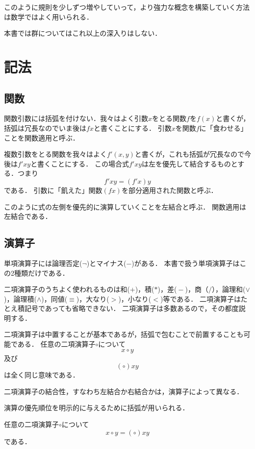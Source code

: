 \documentclass[twocolumn]{jsbook}
\newenvironment{point}{\begin{screen}}{\end{screen}}
\newcommand{\binaryeq}{\equiv}
\newcommand{\binaryl}{<}
\newcommand{\binaryg}{>}
\newcommand{\binaryadd}{+}
\newcommand{\binarysub}{-}
\newcommand{\binarymultiply}{*}
\newcommand{\binarydivide}{/}
\newcommand{\binaryor}{\vee}
\newcommand{\binaryand}{\wedge}
\newcommand{\mathbinaryop}{\circ}
\begin{document}
このように規則を少しずつ増やしていって，より強力な概念を構築していく方法は数学ではよく用いられる．

本書では群についてはこれ以上の深入りはしない．

\chapter{記法}

\section{関数}

関数引数には括弧を付けない．我々はよく引数$x$をとる関数$f$を$f(x)$と書くが，括弧は冗長なのでいま後は$fx$と書くことにする．
引数$x$を関数$f$に「食わせる」ことを関数適用と呼ぶ．

複数引数をとる関数を我々はよく$f'(x,y)$と書くが，これも括弧が冗長なので今後は$f'xy$と書くことにする．
この場合式$f'xy$は左を優先して結合するものとする．つまり$$f'xy=(f'x)y$$である．
引数に「飢えた」関数$(fx)$を部分適用された関数と呼ぶ．

このように式の左側を優先的に演算していくことを左結合と呼ぶ．
関数適用は左結合である．

\section{演算子}

単項演算子には論理否定($\neg$)とマイナス($-$)がある．
本書で扱う単項演算子はこの2種類だけである．

二項演算子のうちよく使われるものは和($\binaryadd$)，積($\binarymultiply$)，差(${}\binarysub{}$)，商（${}\binarydivide{}$），論理和($\binaryor$)，論理積($\binaryand$)，同値($\binaryeq$)，大なり($\binaryg$)，小なり($\binaryl$)等である．
二項演算子はたとえ積記号であっても省略できない．
二項演算子は多数あるので，その都度説明する．

二項演算子は中置することが基本であるが，括弧で包むことで前置することも可能である．
任意の二項演算子$\mathbinaryop$について$$x\mathbinaryop y$$及び$$(\mathbinaryop)xy$$は全く同じ意味である．

二項演算子の結合性，すなわち左結合か右結合かは，演算子によって異なる．

演算の優先順位を明示的に与えるために括弧が用いられる．

\begin{point}
任意の二項演算子$\mathbinaryop$について$$x\mathbinaryop y=(\mathbinaryop)xy$$である．
\end{point}
\end{document}
